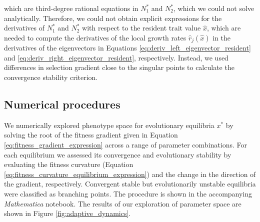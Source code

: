 which are third-degree rational equations in $N^*_1$ and $N^*_2$, which we could not solve analytically. Therefore, we could not obtain explicit expressions for the derivatives of $N^*_1$ and $N^*_2$ with respect to the resident trait value $\hat x$, which are needed to compute the derivatives of the local growth rates $\hat r_j(\hat x)$ in the derivatives of the eigenvectors in Equations \ref{eq:deriv_left_eigenvector_resident} and \ref{eq:deriv_right_eigenvector_resident}, respectively. Instead, we used differences in selection gradient close to the singular points to calculate the convergence stability criterion.

\subsection*{Numerical procedures}

We numerically explored phenotype space for evolutionary equilibria $x^*$ by solving the root of the fitness gradient given in Equation \ref{eq:fitness_gradient_expression} across a range of parameter combinations. For each equilibrium we assessed its convergence and evolutionary stability by evaluating the fitness curvature (Equation \ref{eq:fitness_curvature_equilibrium_expression}) and the change in the direction of the gradient, respectively. Convergent stable but evolutionarily unstable equilibria were classified as branching points. The procedure is shown in the accompanying \textit{Mathematica} notebook. The results of our exploration of parameter space are shown in Figure \ref{fig:adaptive_dynamics}.




